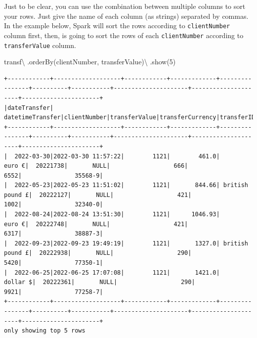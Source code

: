 \documentclass[
  11pt,
  letterpaper,
  DIV=11,
  numbers=noendperiod]{scrreprt}
\newenvironment{Shaded}{\begin{snugshade}}{\end{snugshade}}
\newcommand{\DecValTok}[1]{\textcolor[rgb]{0.68,0.00,0.00}{#1}}
\newcommand{\NormalTok}[1]{\textcolor[rgb]{0.00,0.23,0.31}{#1}}
\newcommand{\OperatorTok}[1]{\textcolor[rgb]{0.37,0.37,0.37}{#1}}
\newcommand{\StringTok}[1]{\textcolor[rgb]{0.13,0.47,0.30}{#1}}
\begin{document}
Just to be clear, you can use the combination between multiple columns
to sort your rows. Just give the name of each column (as strings)
separated by commas. In the example below, Spark will sort the rows
according to \texttt{clientNumber} column first, then, is going to sort
the rows of each \texttt{clientNumber} according to
\texttt{transferValue} column.

\begin{Shaded}
\begin{Highlighting}[]
\NormalTok{transf}\OperatorTok{\textbackslash{}}
\NormalTok{  .orderBy(}\StringTok{\textquotesingle{}clientNumber\textquotesingle{}}\NormalTok{, }\StringTok{\textquotesingle{}transferValue\textquotesingle{}}\NormalTok{)}\OperatorTok{\textbackslash{}}
\NormalTok{  .show(}\DecValTok{5}\NormalTok{)}
\end{Highlighting}
\end{Shaded}

\begin{verbatim}
+------------+-------------------+------------+-------------+----------------+----------+-----------+---------------------+---------------------+----------------------+
|dateTransfer|   datetimeTransfer|clientNumber|transferValue|transferCurrency|transferID|transferLog|destinationBankNumber|destinationBankBranch|destinationBankAccount|
+------------+-------------------+------------+-------------+----------------+----------+-----------+---------------------+---------------------+----------------------+
|  2022-03-30|2022-03-30 11:57:22|        1121|        461.0|          euro €|  20221738|       NULL|                  666|                 6552|               35568-9|
|  2022-05-23|2022-05-23 11:51:02|        1121|       844.66| british pound £|  20222127|       NULL|                  421|                 1002|               32340-0|
|  2022-08-24|2022-08-24 13:51:30|        1121|      1046.93|          euro €|  20222748|       NULL|                  421|                 6317|               38887-3|
|  2022-09-23|2022-09-23 19:49:19|        1121|       1327.0| british pound £|  20222938|       NULL|                  290|                 5420|               77350-1|
|  2022-06-25|2022-06-25 17:07:08|        1121|       1421.0|        dollar $|  20222361|       NULL|                  290|                 9921|               77258-7|
+------------+-------------------+------------+-------------+----------------+----------+-----------+---------------------+---------------------+----------------------+
only showing top 5 rows
\end{verbatim}
\end{document}
